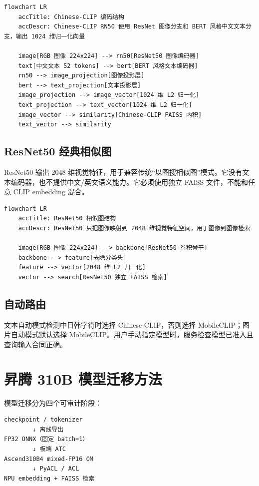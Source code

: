 \begin{lstlisting}
flowchart LR
    accTitle: Chinese-CLIP 编码结构
    accDescr: Chinese-CLIP RN50 使用 ResNet 图像分支和 BERT 风格中文文本分支，输出 1024 维归一化向量

    image[RGB 图像 224x224] --> rn50[ResNet50 图像编码器]
    text[中文文本 52 tokens] --> bert[BERT 风格文本编码器]
    rn50 --> image_projection[图像投影层]
    bert --> text_projection[文本投影层]
    image_projection --> image_vector[1024 维 L2 归一化]
    text_projection --> text_vector[1024 维 L2 归一化]
    image_vector --> similarity[Chinese-CLIP FAISS 内积]
    text_vector --> similarity
\end{lstlisting}

\subsection{ResNet50
经典相似图}\label{resnet50-ux7ecfux5178ux76f8ux4f3cux56fe}

ResNet50 输出 2048
维视觉特征，用于兼容传统``以图搜相似图''模式。它没有文本编码器，也不提供中文/英文语义能力。它必须使用独立
FAISS 文件，不能和任意 CLIP embedding 混合。

\begin{lstlisting}
flowchart LR
    accTitle: ResNet50 相似图结构
    accDescr: ResNet50 只把图像映射到 2048 维视觉特征空间，用于图像到图像检索

    image[RGB 图像 224x224] --> backbone[ResNet50 卷积骨干]
    backbone --> feature[去除分类头]
    feature --> vector[2048 维 L2 归一化]
    vector --> search[ResNet50 独立 FAISS 检索]
\end{lstlisting}

\subsection{自动路由}\label{ux81eaux52a8ux8defux7531}

文本自动模式检测中日韩字符时选择 Chinese-CLIP，否则选择
MobileCLIP；图片自动模式默认选择
MobileCLIP。用户手动指定模型时，服务检查模型已准入且查询输入合同正确。

\section{昇腾 310B
模型迁移方法}\label{ux6607ux817e-310b-ux6a21ux578bux8fc1ux79fbux65b9ux6cd5}

模型迁移分为四个可审计阶段：

\begin{lstlisting}
checkpoint / tokenizer
        ↓ 离线导出
FP32 ONNX（固定 batch=1）
        ↓ 板端 ATC
Ascend310B4 mixed-FP16 OM
        ↓ PyACL / ACL
NPU embedding + FAISS 检索
\end{lstlisting}

